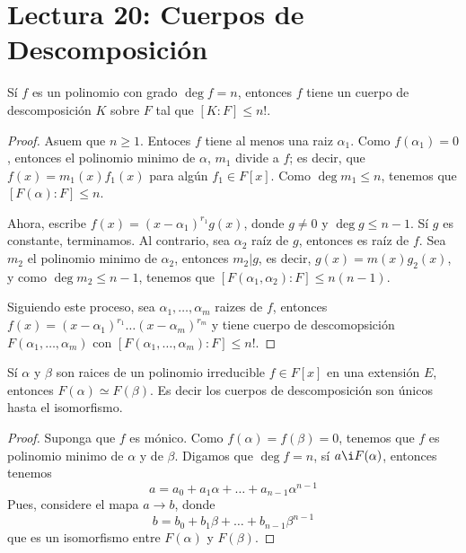 \section*{Lectura 20: Cuerpos de Descomposici\'on}

\begin{lemma}\label{lemma_84}
    S\'i $f$ es un polinomio con grado  $\deg{f}=n$, entonces $f$ tiene un
    cuerpo de descomposici\'on  $K$ sobre  $F$ tal que  $[K:F] \leq n!$.
\end{lemma}
\begin{proof}
    Asuem que $n \geq 1$. Entoces  $f$ tiene al menos una raiz  $\alpha_1$. Como
    $f(\alpha_1)=0$, entonces el polinomio minimo de $\alpha$,  $m_1$ divide a
    $f$; es decir, que $f(x)=m_1(x)f_1(x)$ para alg\'un $f_1 \in F[x]$. Como
    $\deg{m_1} \leq n$, tenemos que $[F(\alpha):F] \leq n$.

    Ahora, escribe $f(x)=(x-\alpha_1)^{r_1}g(x)$, donde $g \neq 0$ y  $\deg{g}
    \leq n-1$. S\'i $g$ es constante, terminamos. Al contrario, sea  $\alpha_2$
    ra\'iz de $g$, entonces es ra\'iz de  $f$. Sea  $m_2$ el polinomio minimo de
    $\alpha_2$, entonces $m_2|g$, es decir, $g(x)=m(x)g_2(x)$, y como $\deg{m_2}
    \leq n-1$, tenemos que $[F(\alpha_1,\alpha_2):F] \leq n(n-1)$.

    Siguiendo este proceso, sea $\alpha_1, \dots, \alpha_m$ raizes de $f$,
    entonces $f(x)=(x-\alpha_1)^{r_1} \dots (x-\alpha_m)^{r_m}$ y tiene cuerpo
    de descomopsici\'on $F(\alpha_1, \dots, \alpha_m)$ con $[F(\alpha_1, \dots,
    \alpha_m) : F] \leq n!$.
\end{proof}

\begin{theorem}\label{theorem_85}
    S\'i $\alpha$ y  $\beta$ son raices de un polinomio irreducible $f \in
    F[x]$ en una extensi\'on $E$, entonces  $F(\alpha) \simeq F(\beta)$. Es
    decir los cuerpos de descomposici\'on son \'unicos hasta el isomorfismo.
\end{theorem}
\begin{proof}
    Suponga que $f$ es m\'onico. Como  $f(\alpha)=f(\beta)=0$, tenemos que $f$
    es polinomio minimo de  $\alpha$ y de  $\beta$. Digamos que  $\deg{f}=n$,
    s\'i $a \i F(\alpha)$, entonces tenemos
    \begin{equation*}
        a=a_0+a_1\alpha+\dots+a_{n-1}\alpha^{n-1}
    \end{equation*}
    Pues, considere el mapa $a \xrightarrow{} b$, donde
    \begin{equation*}
        b=b_0+b_1\beta+\dots+b_{n-1}\beta^{n-1}
    \end{equation*}
    que es un isomorfismo entre $F(\alpha)$ y $F(\beta)$.
\end{proof}

